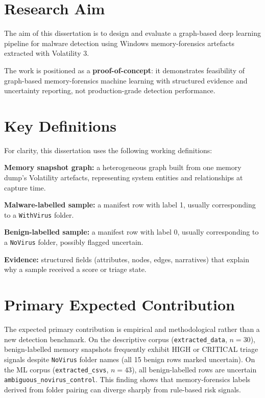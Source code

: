 \section{Research Aim}

The aim of this dissertation is to design and evaluate a graph-based deep learning pipeline for malware detection using Windows memory-forensics artefacts extracted with Volatility 3.

The work is positioned as a \textbf{proof-of-concept}: it demonstrates feasibility of graph-based memory-forensics machine learning with structured evidence and uncertainty reporting, not production-grade detection performance.

\section{Key Definitions}

For clarity, this dissertation uses the following working definitions:

\textbf{Memory snapshot graph:} a heterogeneous graph built from one memory dump's Volatility artefacts, representing system entities and relationships at capture time.

\textbf{Malware-labelled sample:} a manifest row with label 1, usually corresponding to a \texttt{WithVirus} folder.

\textbf{Benign-labelled sample:} a manifest row with label 0, usually corresponding to a \texttt{NoVirus} folder, possibly flagged uncertain.

\textbf{Evidence:} structured fields (attributes, nodes, edges, narratives) that explain why a sample received a score or triage state.

\section{Primary Expected Contribution}

The expected primary contribution is empirical and methodological rather than a new detection benchmark. On the descriptive corpus (\texttt{extracted\_data}, $n{=}30$), benign-labelled memory snapshots frequently exhibit HIGH or CRITICAL triage signals despite \texttt{NoVirus} folder names (all 15 benign rows marked uncertain). On the ML corpus (\texttt{extracted\_csvs}, $n{=}43$), all benign-labelled rows are uncertain \texttt{ambiguous\_novirus\_control}. This finding shows that memory-forensics labels derived from folder pairing can diverge sharply from rule-based risk signals.


